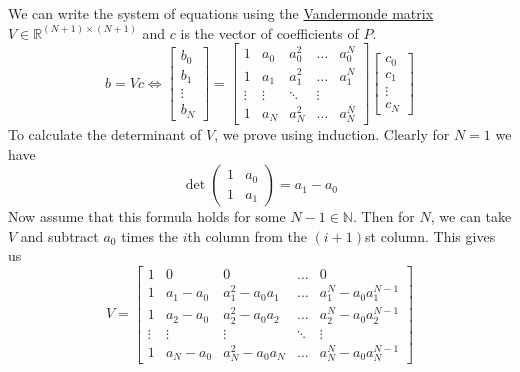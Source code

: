   \begin{solution}
    We can write the system of equations using the \hyperref[lin-def:vandermonde-matrix]{Vandermonde matrix} $V \in \mathbb{R}^{(N+1) \times (N+1)}$ and $c$ is the vector of coefficients of $P$. 
    \begin{equation}
      b = V c \iff \begin{bmatrix}
        b_0 \\ b_1 \\ \vdots \\ b_N
      \end{bmatrix} = \begin{bmatrix}
        1 & a_0 & a_0^2 & \ldots & a_0^N \\ 
        1 & a_1 & a_1^2 & \ldots & a_1^N \\ 
        \vdots & \vdots & \ddots & \vdots \\
        1 & a_N & a_N^2 & \ldots & a_N^N 
      \end{bmatrix} \begin{bmatrix}
        c_0 \\ c_1 \\ \vdots \\ c_N
      \end{bmatrix}
    \end{equation} 
    To calculate the determinant of $V$, we prove using induction. Clearly for $N = 1$ we have 
    \begin{equation}
      \det \begin{pmatrix}
        1 & a_0 \\ 1 & a_1 
      \end{pmatrix} = a_1 - a_0
    \end{equation}
    Now assume that this formula holds for some $N-1 \in \mathbb{N}$. Then for $N$, we can take $V$ and subtract $a_0$ times the $i$th column from the $(i+1)$st column. This gives us
    \begin{equation}
      V = 
      \begin{bmatrix}
        1 & 0 & 0 & \ldots & 0 \\
        1 & a_1-a_0 & a_1^2-a_0a_1 & \ldots & a_1^N-a_0a_1^{N-1} \\
        1 & a_2-a_0 & a_2^2-a_0a_2 & \ldots & a_2^N-a_0a_2^{N-1} \\
        \vdots & \vdots & \vdots & \ddots & \vdots \\
        1 & a_N-a_0 & a_N^2-a_0a_N & \ldots & a_N^N-a_0a_N^{N-1}
      \end{bmatrix}

\end{equation}
\end{solution}
